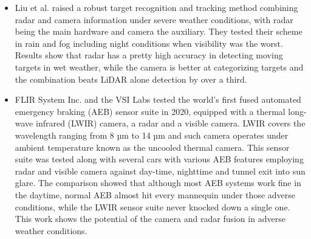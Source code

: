\documentclass[rnd]{mas_proposal}
\begin{document}
\begin{itemize}
    \item Liu et al. \cite{liu2021robust} raised a robust target recognition and tracking method combining radar and camera information under severe weather conditions, with radar being the main hardware and camera the auxiliary. They tested their scheme in rain and fog including night conditions when visibility was the worst. Results show that radar has a pretty high accuracy in detecting moving targets in wet weather, while the camera is better at categorizing targets and the combination beats LiDAR alone detection by over a third.

    \item FLIR System Inc. \cite{fused_aeb} and the VSI Labs \cite{VSILabs} tested the world’s first fused automated emergency braking (AEB) sensor suite in 2020, equipped with a thermal long-wave infrared (LWIR) camera, a radar and a visible camera. LWIR covers the wavelength ranging from 8 µm to 14 µm and such camera operates under ambient temperature known as the uncooled thermal camera. This sensor suite was tested along with several cars with various AEB features employing radar and visible camera against day-time, nighttime and tunnel exit into sun glare. The comparison showed that although most AEB systems work fine in the daytime, normal AEB almost hit every mannequin under those adverse conditions, while the LWIR sensor suite never knocked down a single one. This work shows the potential of the camera and radar fusion in adverse weather conditions.


\end{itemize}
\end{document}
